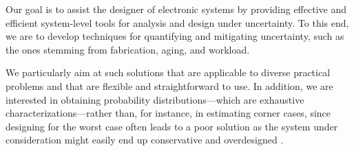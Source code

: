 Our goal is to assist the designer of electronic systems by providing effective
and efficient system-level tools for analysis and design under uncertainty. To
this end, we are to develop techniques for quantifying and mitigating
uncertainty, such as the ones stemming from fabrication, aging, and workload.

We particularly aim at such solutions that are applicable to diverse practical
problems and that are flexible and straightforward to use. In addition, we are
interested in obtaining probability distributions---which are exhaustive
characterizations---rather than, for instance, in estimating corner cases, since
designing for the worst case often leads to a poor solution as the system under
consideration might easily end up conservative and overdesigned
\cite{quinton2012}.
